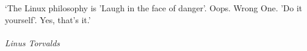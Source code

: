 
\clearpage

\narrowlinespacing

\vspace*{4mm}

`The Linux philosophy is 'Laugh in the face of danger'. Oops. Wrong One. 'Do it yourself'. Yes, that's it.'\\
\\
\emph{Linus Torvalds}

\normallinespacing
